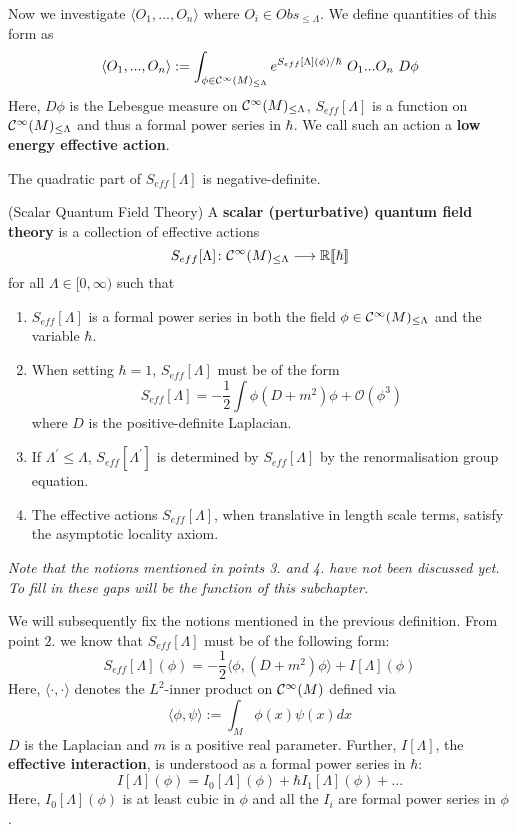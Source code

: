 Now we investigate $\langle O_1, ..., O_n \rangle$ where $O_i \in Obs_{\leq \Lambda}$. We define quantities of this form as
$$ \langle O_1, ..., O_n \rangle := \int_{\phi \in \Ci(M)_{\leq \Lambda}} e^{S_{eff}[\Lambda](\phi) / \hbar} \ O_1 ... O_n \ D\phi$$
Here, $D\phi$ is the Lebesgue measure on $\mathcal{C}^{\infty}(M)_{\leq \Lambda}$, $S_{eff}[\Lambda]$ is a function on $\mathcal{C}^{\infty}(M)_{\leq \Lambda}$ and thus a formal power series in $\hbar$. We call such an action a \textbf{low energy effective action}.

\begin{rem}
  The quadratic part of $S_{eff}[\Lambda]$ is negative-definite.
\end{rem}

\begin{definition}(Scalar Quantum Field Theory)
\label{def:scalar_qft}
  A \textbf{scalar (perturbative) quantum field theory} is a collection of effective actions
  $$ S_{eff}[\Lambda]\colon \mathcal{C}^{\infty}(M)_{\leq \Lambda} \longrightarrow \mathbb{R}\llbracket\hbar\rrbracket $$
  for all $\Lambda \in [0,\infty)$ such that
  \begin{enumerate}
    \item $S_{eff}[\Lambda]$ is a formal power series in both the field $\phi \in \Ci(M)_{\leq \Lambda}$ and the variable $\hbar$.

    \item When setting $\hbar = 1$, $S_{eff}[\Lambda]$ must be of the form
    $$ S_{eff}[\Lambda] = - \frac{1}{2} \int \phi (D + m^2) \phi + \mathcal{O}(\phi^3) $$
    where $D$ is the positive-definite Laplacian.

    \item If $\Lambda^\prime \leq \Lambda$, $S_{eff}[\Lambda^\prime]$ is determined by $S_{eff}[\Lambda]$ by the renormalisation group equation.

    \item The effective actions $S_{eff}[\Lambda]$, when translative in length scale terms, satisfy the asymptotic locality axiom.
  \end{enumerate}
  \emph{Note that the notions mentioned in points 3. and 4. have not been discussed yet. To fill in these gaps will be the function of this subchapter.}
\end{definition}

We will subsequently fix the notions mentioned in the previous definition. From point $2.$ we know that $S_{eff}[\Lambda]$ must be of the following form:
$$S_{eff}[\Lambda](\phi) = - \frac{1}{2} \langle \phi, (D+m^2)\phi \rangle + I[\Lambda](\phi) $$
Here, $\langle \cdot , \cdot \rangle$ denotes the $L^2$-inner product on $\mathcal{C}^{\infty}(M)$ defined via
$$ \langle \phi , \psi \rangle := \int_M \phi(x) \psi(x) dx$$
$D$ is the Laplacian and $m$ is a positive real parameter. Further, $I[\Lambda]$, the \textbf{effective interaction}, is understood as a formal power series in $\hbar$:
$$ I[\Lambda](\phi) = I_0[\Lambda](\phi) + \hbar I_1[\Lambda](\phi) + ... $$
Here, $I_0[\Lambda](\phi)$ is at least cubic in $\phi$ and all the $I_i$ are formal power series in $\phi$.\\

